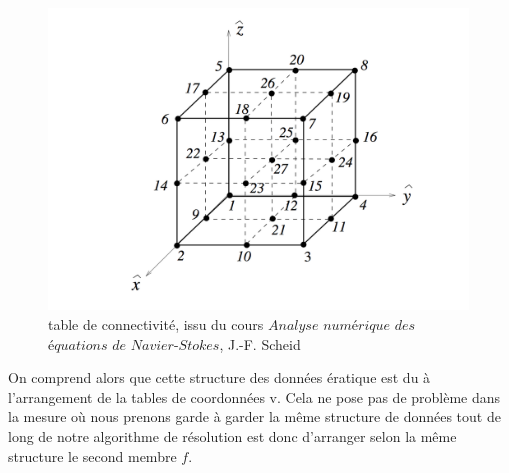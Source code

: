 \documentclass[a4paper,12pt,titlepage]{report}
\begin{document}
\begin{onehalfspace}
\begin{figure}[h]
\center
\includegraphics[height = 8cm, keepaspectratio]{graphes/table_de_connectivite.png} 
\caption{\label{figure 3 } table de connectivité, issu du cours $Analyse$ $numérique$ $des$ $équations$ $de$ $Navier$-$Stokes$, J.-F. Scheid}
\end{figure}
On comprend alors que cette structure des données ératique est du à l'arrangement de la tables de coordonnées v. Cela ne pose pas de problème dans la mesure où nous prenons garde à garder la même structure de données tout de long de notre algorithme de résolution est donc d'arranger selon la même structure le second membre $f$.




\end{onehalfspace}
\end{document}
